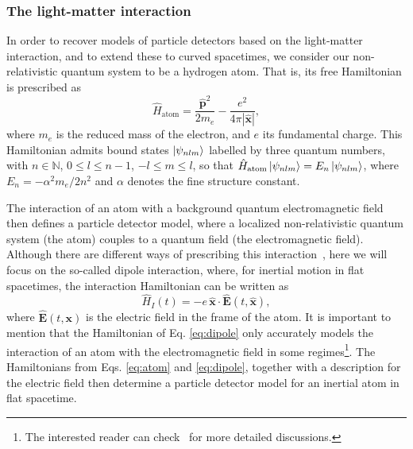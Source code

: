 \documentclass[prd,twocolumn,superscriptaddress,floatfix,amsmath,amssymb,amsfonts,longbibliography,nofootinbib]{revtex4-1}
\begin{document}
\subsubsection{The light-matter interaction} 

In order to recover models of particle detectors based on the light-matter interaction, and to extend these to curved spacetimes, we consider our non-relativistic quantum system to be a hydrogen atom. That is, its free Hamiltonian is prescribed as
\begin{equation}\label{eq:atom}
    \hat{H}_\textrm{atom} = \frac{\hat{\bm p}^2}{2 m_e}-\frac{e^2}{4\pi |\hat{\bm x}|},
\end{equation}
where $m_e$ is the reduced mass of the electron, and $e$ its fundamental charge. This Hamiltonian admits bound states $\ket{\psi_{nlm}}$ labelled by three quantum numbers, with $n\in \mathbb{N}$, $0\leq l \leq n-1$, $-l\leq m \leq l$, so that \mbox{$\hat{H}_\textrm{atom}\ket{\psi_{nlm}} = E_n \ket{\psi_{nlm}}$}, where $E_n = - \alpha^2 m_e/2n^2$ and $\alpha$ denotes the fine structure constant.

The interaction of an atom with a background quantum electromagnetic field then defines a particle detector model, where a localized non-relativistic quantum system (the atom) couples to a quantum field (the electromagnetic field). Although there are different ways of prescribing this interaction~\cite{Nicho1,richard}, here we will focus on the so-called dipole interaction, where, for inertial motion in flat spacetimes, the interaction Hamiltonian can be written as
\begin{equation}\label{eq:dipole}
    \hat{H}_I(t) = -e\,\hat{\bm x}\cdot \hat{\bm E}(t,\hat{\bm x}),
\end{equation}
where $\hat{\bm E}(t,\bm x)$ is the electric field in the frame of the atom. It is important to mention that the Hamiltonian of Eq. \eqref{eq:dipole} only accurately models the interaction of an atom with the electromagnetic field in some regimes\footnote{The interested reader can check~\cite{Nicho1,richard} for more detailed discussions.}. The Hamiltonians from Eqs. \eqref{eq:atom} and \eqref{eq:dipole}, together with a description for the electric field then determine a particle detector model for an inertial atom in flat spacetime.
\end{document}
